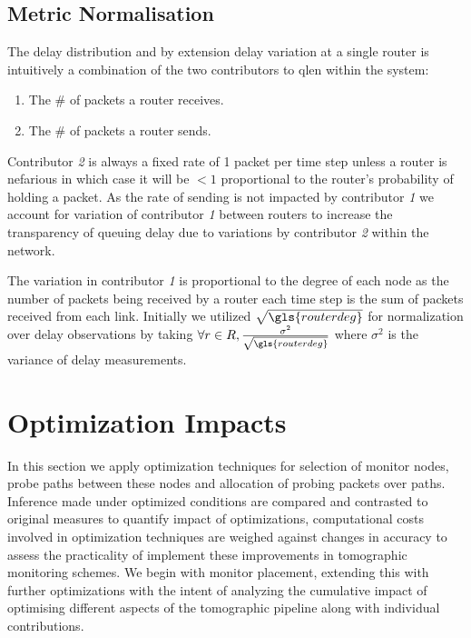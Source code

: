 \subsection{Metric Normalisation}
\label{ssec:Rmetricnormalisation}
The delay distribution and by extension delay variation at a single router is intuitively a combination of the two contributors to \gls{qlen} within the system:
\begin{enumerate}
    \item The \# of packets a router receives.
    \item The \# of packets a router sends.
\end{enumerate}
Contributor \emph{2} is always a fixed rate of 1 packet per time step unless a router is nefarious in which case it will be $<1$ proportional to the router's probability of holding a packet. As the rate of sending is not impacted by contributor \emph{1} we account for variation of contributor \emph{1} between routers to increase the transparency of queuing delay due to variations by contributor \emph{2} within the network.\par
The variation in contributor \emph{1} is proportional to the degree of each node as the number of packets being received by a router each time step is the sum of packets received from each link. Initially we utilized $\sqrt{\gls{routerdeg}}$ for normalization over delay observations by taking $\forall r\in R, \frac{\sigma^2}{\sqrt{\gls{routerdeg}}}$ where $\sigma^2$ is the variance of delay measurements.

\section{Optimization Impacts}
\label{sec:Rprobingoptimality}
In this section we apply optimization techniques for selection of monitor nodes, probe paths between these nodes and allocation of probing packets over paths. Inference made under optimized conditions are compared and contrasted to original measures to quantify impact of optimizations, computational costs involved in optimization techniques are weighed against changes in accuracy to assess the practicality of implement these improvements in tomographic monitoring schemes. We begin with monitor placement, extending this with further optimizations with the intent of analyzing the cumulative impact of optimising different aspects of the tomographic pipeline along with individual contributions.
